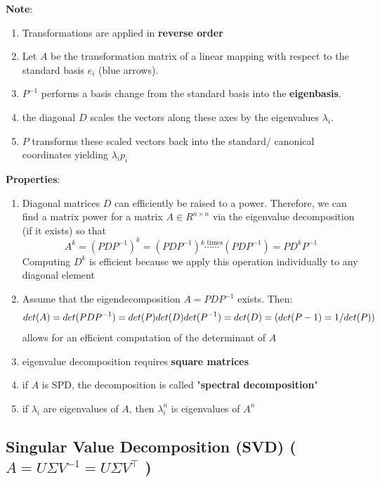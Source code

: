 \noindent\textbf{Note}:
\begin{enumerate}
    \item Transformations are applied in \textbf{reverse order}

    \item Let $A$ be the transformation matrix of a linear mapping with respect to the standard basis $e_i$ (blue arrows). 

    \item $P^{-1}$ performs a basis change from the standard basis into the \textbf{eigenbasis}. 

    \item the diagonal $D$ scales the vectors along these axes by the eigenvalues $\lambda_i$. 

    \item $P$ transforms these scaled vectors back into the standard/ canonical coordinates yielding $\lambda_ip_i$
\end{enumerate}

\noindent\textbf{Properties}:
\begin{enumerate}
    \item Diagonal matrices $D$ can efficiently be raised to a power. Therefore, we can find a matrix power for a matrix $A \in R^{n\times n}$ via the eigenvalue decomposition (if it exists) so that 
    \[
        A^k = (PDP^{-1})^k = (PDP^{-1})\overset{k \text{ times}}{\cdots\cdots}(PDP^{-1}) = PD^kP^{-1}
    \]
    Computing $D^k$ is efficient because we apply this operation individually to any diagonal element

    \item Assume that the eigendecomposition $A = PDP^{-1}$ exists. Then:
    \[
    det(A) = det(PDP^{-1}) = det(P)det(D)det(P^{-1}) = det(D) =  
    \hfill (det(P-1) = 1 / det(P))
    \]
    allows for an efficient computation of the determinant of $A$

    \item eigenvalue decomposition requires \textbf{square matrices}

    \item if $A$ is SPD, the decomposition is called "\textbf{spectral decomposition}"

    \item if $\lambda _i$ are eigenvalues of $A$, then $\lambda _i^n$ is eigenvalues of $A^n$
\end{enumerate}


\subsection{Singular Value Decomposition (SVD) ( $A = U\Sigma V^{-1} = U\Sigma V^\top$ )}

